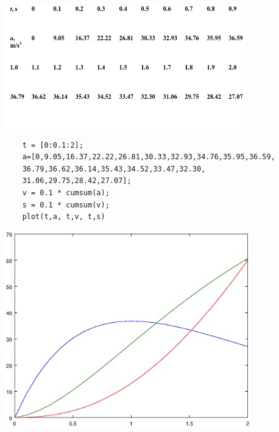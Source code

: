 \documentclass[12pt,a4paper]{article}
\begin{document}
\includegraphics[width = \textwidth]{screenshot001.png}
\begin{lstlisting}
	t = [0:0.1:2];
	a=[0,9.05,16.37,22.22,26.81,30.33,32.93,34.76,35.95,36.59,
	36.79,36.62,36.14,35.43,34.52,33.47,32.30,
	31.06,29.75,28.42,27.07];
	v = 0.1 * cumsum(a);
	s = 0.1 * cumsum(v);
	plot(t,a, t,v, t,s)
\end{lstlisting}
\includegraphics[width=0.8\textwidth]{3.eps}
\end{document}
